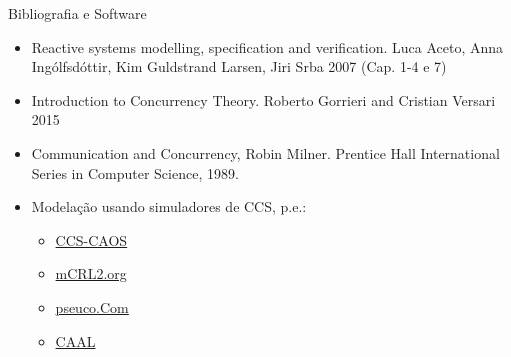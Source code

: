 \documentclass[aspectratio=169]{beamer}
\begin{document}
\begin{frame}{Bibliografia e Software}
  \begin{itemize}
    \item Reactive systems modelling, specification and verification. Luca Aceto, Anna Ingólfsdóttir, Kim Guldstrand Larsen, Jiri Srba
2007 (Cap. 1-4 e 7)
\item Introduction to Concurrency Theory.
Roberto Gorrieri and Cristian Versari
2015
\item Communication and Concurrency, Robin Milner.
 Prentice Hall International Series in Computer Science, 1989.
\item Modelação usando simuladores de CCS, p.e.: 
  \begin{itemize}
    \item \href{https://lmf.di.uminho.pt/ccs-caos/}{CCS-CAOS}
    \item \href{https://mcrl2.org}{mCRL2.org}
    \item \href{https://pseuco.com}{pseuco.Com}
    \item \href{http://caal.cs.aau.dk}{CAAL}
\end{itemize}
\end{itemize}
\end{frame}
\end{document}
